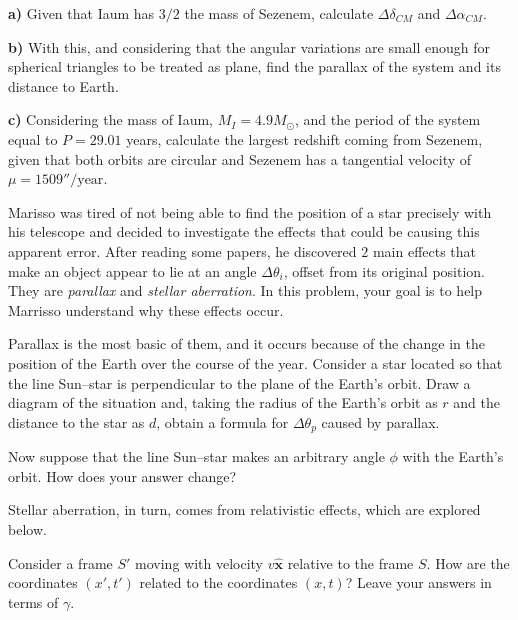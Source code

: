 \documentclass[11pt]{article}
\begin{document}
\begin{pproblem}
    \textbf{a)} Given that Iaum has \(3/2\) the mass of Sezenem, calculate \(\Delta\delta_{CM}\) and \(\Delta\alpha_{CM}\).
    
    \textbf{b)} With this, and considering that the angular variations are small enough for spherical triangles to be treated as plane, find the parallax of the system and its distance to Earth.

    \textbf{c)} Considering the mass of Iaum, \(M_I = 4.9 M_\odot\), and the period of the system equal to \(P = 29.01\) years, calculate the largest redshift coming from Sezenem, given that both orbits are circular and Sezenem has a tangential velocity of \(\mu = 1509''/\text{year}\).

\end{pproblem}

\begin{pproblem} Marisso was tired of not being able to find the position of a star precisely with his telescope and decided to investigate the effects that could be causing this apparent error. After reading some papers, he discovered \(2\) main effects that make an object appear to lie at an angle \(\Delta \theta_i\), offset from its original position. They are \textit{parallax} and \textit{stellar aberration}. In this problem, your goal is to help Marrisso understand why these effects occur.
    \begin{alternativas}
        \item Parallax is the most basic of them, and it occurs because of the change in the position of the Earth over the course of the year. Consider a star located so that the line Sun--star is perpendicular to the plane of the Earth's orbit. Draw a diagram of the situation and, taking the radius of the Earth's orbit as \(r\) and the distance to the star as \(d\), obtain a formula for \(\Delta \theta_p\) caused by parallax.
        
        \item Now suppose that the line Sun--star makes an arbitrary angle \(\phi\) with the Earth's orbit. How does your answer change?
        
        Stellar aberration, in turn, comes from relativistic effects, which are explored below.

        \item Consider a frame \(S'\) moving with velocity \(v\hat{\mathbf{x}}\) relative to the frame \(S\). How are the coordinates \((x', t')\) related to the coordinates \((x,t)\)? Leave your answers in terms of \(\gamma\).
        

\end{alternativas}
\end{pproblem}
\end{document}

